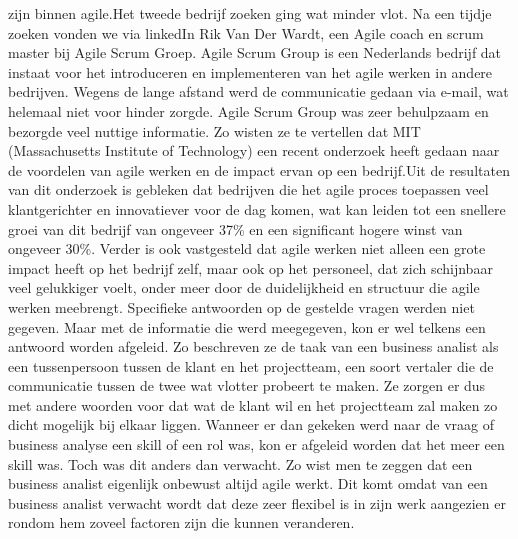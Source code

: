 \documentclass{hogent-article}
\begin{document}
zijn binnen agile.\newline \newline Het tweede bedrijf zoeken ging wat minder vlot. Na een tijdje zoeken vonden we via linkedIn Rik Van Der Wardt, een Agile coach en scrum master bij Agile Scrum Groep. Agile Scrum Group is een Nederlands bedrijf dat instaat voor het introduceren en implementeren van het agile werken in andere bedrijven. Wegens de lange afstand werd de communicatie gedaan via e-mail, wat helemaal niet voor hinder zorgde. Agile Scrum Group was zeer behulpzaam en bezorgde veel nuttige informatie. Zo wisten ze te vertellen dat MIT (Massachusetts Institute of Technology) een recent onderzoek heeft gedaan naar de voordelen van agile werken en de impact ervan op een bedrijf.\newline \newline Uit de resultaten van dit onderzoek is gebleken dat bedrijven die het agile proces toepassen veel klantgerichter en innovatiever voor de dag komen, wat kan leiden tot een snellere groei van dit bedrijf van ongeveer 37\% en een significant hogere winst van ongeveer 30\%. \newline
	\newline
	Verder is ook vastgesteld dat agile werken niet alleen een grote impact heeft op het bedrijf zelf, maar ook op het personeel, dat zich schijnbaar veel gelukkiger voelt, onder meer door de duidelijkheid en structuur die agile werken meebrengt.\newline
	Specifieke antwoorden op de gestelde vragen werden niet gegeven. Maar met de informatie die werd meegegeven, kon er wel telkens een antwoord worden afgeleid. Zo beschreven ze de taak van een business analist als een tussenpersoon tussen de klant en het projectteam, een soort vertaler die de communicatie tussen de twee wat vlotter probeert te maken. Ze zorgen er dus met andere woorden voor dat wat de klant wil en het projectteam zal maken zo dicht mogelijk bij elkaar liggen. \newline \newline Wanneer er dan gekeken werd naar de vraag of business analyse een skill of een rol was, kon er afgeleid worden dat het meer een skill was. Toch was dit anders dan verwacht. Zo wist men te zeggen dat een business analist eigenlijk onbewust altijd agile werkt. Dit komt omdat van een business analist verwacht wordt dat deze zeer flexibel is in zijn werk aangezien er rondom hem zoveel factoren zijn die kunnen veranderen.\newline
	\newline
\end{document}
